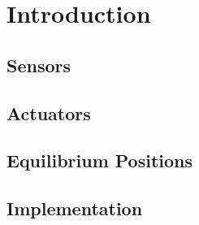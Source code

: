 \section{Introduction}

\subsection{Sensors}
\subsection{Actuators}
\subsection{Equilibrium Positions}
\subsection{Implementation}
